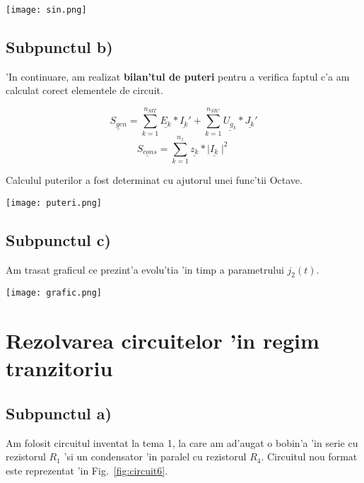 \documentclass[titlepage, a4paper,12pt]{article}
\begin{document}
\begin{center}
\texttt{[image: sin.png]}
\end{center}


\newpage


\subsection{Subpunctul b)} \mbox{}

'In continuare, am realizat \textbf{bilan'tul de puteri} pentru a verifica faptul c'a am calculat corect elementele de circuit.

$$\underline{S_{gen}}=\sum_{k=1}^{n_{SIT}} \underline{E_k}*\underline{I_k}' + \sum_{k=1}^{n_{SIC}}\underline{U_{g_k}}*\underline{J_k}'$$
$$\underline{S_{cons}}=\sum_{k=1}^{n_{z}} \underline{z_k} * \mid \underline{I_k} \mid ^2 $$

Calculul puterilor a fost determinat cu ajutorul unei func'tii Octave.

\begin{center}
\texttt{[image: puteri.png]}
\end{center}

\subsection{Subpunctul c)} \mbox{}

Am trasat graficul ce prezint'a evolu'tia 'in timp a parametrului $j_2(t)$.

\begin{center}
\texttt{[image: grafic.png]}
\end{center}


\section{Rezolvarea circuitelor 'in regim tranzitoriu}

\subsection{Subpunctul a)} \mbox{}

Am folosit circuitul inventat la tema 1, la care am ad'augat o bobin'a 'in serie cu rezistorul $R_1$ 'si un condensator 'in paralel cu rezistorul $R_4$. Circuitul nou format este reprezentat 'in Fig.~\ref{fig:circuit6}.

\end{document}
